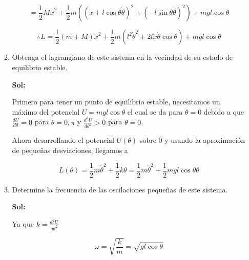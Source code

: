 \documentclass[12pt,a4paper]{article}
\begin{document}
\begin{enumerate}
\begin{enumerate}
    \begin{equation*}
        = \frac{1}{2}M \dot{x}^{2}  + \frac{1}{2} m ((\dot{x} + l \cos{\theta}\dot{\theta})^{2} + (-l\sin{\theta}\dot{\theta})^{2}) + mgl \cos{\theta}
    \end{equation*}
    
    \begin{equation*}
        \therefore L = \frac{1}{2}(m+M) \dot{x}^2 + \frac{1}{2} m (l^2 \dot{\theta}^2 + 2l \dot{x}\dot{\theta}\cos{\theta}) + mgl \cos{\theta}
    \end{equation*}
    
    \item Obtenga el lagrangiano de este sistema en la vecindad de su estado de equilibrio estable.
    
    \textbf{Sol:}
    
    Primero para tener un punto de equilibrio estable, necesitamos un máximo del potencial $U= mgl\cos{\theta}$ el cual se da para  $\theta = 0$ debido a que $\frac{d U}{d \theta} = 0$ para $\theta = 0 , \pi$ y  $\frac{d^2 U}{d \theta^2} > 0$ para $\theta = 0$.
    
    Ahora desarrollando el potencial $U(\theta)$ sobre $0$ y usando la aproximación de pequeñas desviaciones, llegamos a
    
    \begin{equation*}
        L (\theta) = \frac{1}{2} m \dot{\theta}^2 + \frac{1}{2} k \theta =\frac{1}{2} m \dot{\theta}^2 + \frac{1}{2} mgl\cos{\theta} \theta
     \end{equation*}
    
    \item Determine la frecuencia de las oscilaciones pequeñas de este sistema.
    
    \textbf{Sol:}
    
    Ya que $k = \frac{d^2 U}{d \theta ^2}$
    
    \begin{equation*}
        \omega = \sqrt{\frac{k}{m}} = \sqrt{gl\cos{\theta}}
    \end{equation*}
    
\end{enumerate}
    
\end{enumerate}
\end{document}
